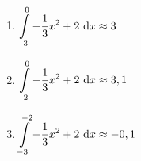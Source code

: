 \begin{Answer}[ref=integralGrafisch1]
\begin{minipage}{\textwidth}
\begin{minipage}{0.5\textwidth}
\begin{enumerate}[label=\alph*)]
                \item \(\displaystyle\int\limits_{-3}^{0} -\frac{1}{3}x^2+2\ \text{d} x\approx 3\)
                \item \(\displaystyle\int\limits_{-2}^{0} -\frac{1}{3}x^2+2\ \text{d} x\approx 3,1\)
                \item \(\displaystyle\int\limits_{-3}^{-2} -\frac{1}{3}x^2+2\ \text{d} x\approx -0,1\)
            \end{enumerate}
        \end{minipage}%
    \end{minipage}
\end{Answer}